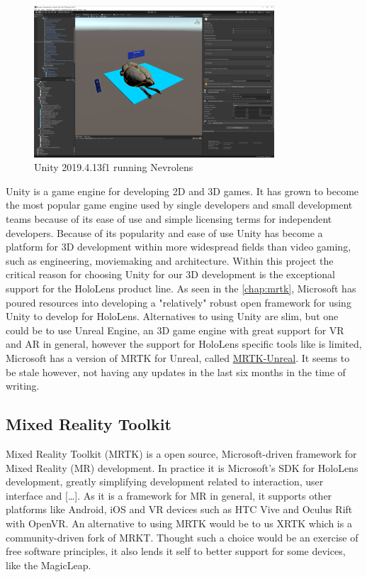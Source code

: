 \begin{figure}[ht]
    \centering
    \includegraphics[width=0.8\textwidth]{fig/unity_example.png}
    \caption{Unity 2019.4.13f1 running Nevrolens}
\end{figure}

Unity is a game engine for developing 2D and 3D games. It has grown to become the most popular game engine used by single developers and small development teams because of its ease of use and simple licensing terms for independent developers. Because of its popularity  and ease of use Unity has become a platform for 3D development within more widespread fields than video gaming, such as engineering, moviemaking and architecture. 
Within this project the critical reason for choosing Unity for our 3D development is the exceptional support for the HoloLens product line. As seen in the \autoref{chap:mrtk}, Microsoft has poured resources into developing a "relatively" robust open framework for using Unity to develop for HoloLens. 
Alternatives to using Unity are slim, but one could be to use Unreal Engine, an 3D game engine with great support for VR and AR in general, however the support for HoloLens specific tools like  is limited, Microsoft has a version of MRTK for Unreal, called \href{https://github.com/microsoft/MixedRealityToolkit-Unreal}{MRTK-Unreal}. It seems to be stale however, not having any updates in the last six months in the time of writing.

\subsection*{Mixed Reality Toolkit}\label{chap:mrtk}
Mixed Reality Toolkit (MRTK) is a open source, Microsoft-driven framework for Mixed Reality (MR) development. In practice it is Microsoft's SDK for HoloLens development, greatly simplifying development related to interaction, user interface and  [\dots]. As it is a framework for MR in general, it supports other platforms like Android, iOS and VR devices such as HTC Vive and Oculus Rift with OpenVR. 
An alternative to using MRTK would be to us XRTK which is a community-driven fork of MRKT. Thought such a choice would be an exercise of free software principles, it also lends it self to better support for some devices, like the MagicLeap.



